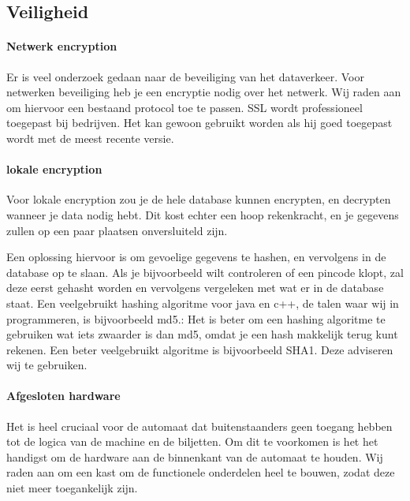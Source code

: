 \documentclass{article}
\begin{document}
\newpage

\subsection{Veiligheid}

\paragraph{Netwerk encryption}

Er is veel onderzoek gedaan naar de beveiliging van het dataverkeer.
Voor netwerken beveiliging heb je een encryptie nodig over het netwerk.
Wij raden aan om hiervoor een bestaand protocol toe te passen.
SSL wordt professioneel toegepast bij bedrijven.
Het kan gewoon gebruikt worden als hij goed toegepast wordt met de meest recente versie.

\paragraph{lokale encryption}

Voor lokale encryption zou je de hele database kunnen encrypten, en decrypten wanneer je data nodig hebt.
Dit kost echter een hoop rekenkracht, en je gegevens zullen op een paar plaatsen onversluiteld zijn.

Een oplossing hiervoor is om gevoelige gegevens te hashen, en vervolgens in de database op te slaan.
Als je bijvoorbeeld wilt controleren of een pincode klopt, zal deze eerst gehasht worden en vervolgens vergeleken met wat er in de database staat.
Een veelgebruikt hashing algoritme voor java en c++, de talen waar wij in programmeren, is bijvoorbeeld md5.:
Het is beter om een hashing algoritme te gebruiken wat iets zwaarder is dan md5, omdat je een hash makkelijk terug kunt rekenen.
Een beter veelgebruikt algoritme is bijvoorbeeld SHA1.
Deze adviseren wij te gebruiken.

\hfill

\centerline{  }

\paragraph{Afgesloten hardware}

Het is heel cruciaal voor de automaat dat buitenstaanders geen toegang hebben tot de logica van de machine en de biljetten.
Om dit te voorkomen is het het handigst om de hardware aan de binnenkant van de automaat te houden.
Wij raden aan om een kast om de functionele onderdelen heel te bouwen, zodat deze niet meer toegankelijk zijn.
\end{document}
